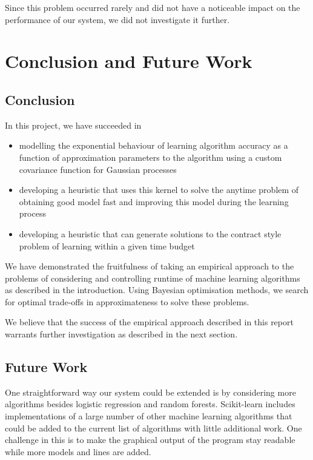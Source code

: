 \documentclass[a4paper,12pt,twoside,openright]{report}
\begin{document}
Since this problem occurred rarely and did not have a noticeable impact on the performance of our system, we did not investigate it further.







\chapter{Conclusion and Future Work} 
\section{Conclusion}
In this project, we have succeeded in
\begin{itemize}
	\item modelling the exponential behaviour of learning algorithm accuracy as a function of approximation parameters to the algorithm using a custom covariance function for Gaussian processes
	\item developing a heuristic that uses this kernel to solve the anytime problem of obtaining good model fast and improving this model during the learning process
	\item developing a heuristic that can generate solutions to the contract style problem of learning within a given time budget
\end{itemize}

We have demonstrated the fruitfulness of taking an empirical approach to the problems of considering and controlling runtime of machine learning algorithms as described in the introduction. Using Bayesian optimisation methods, we search for optimal trade-offs in approximateness to solve these problems.

We believe that the success of the empirical approach described in this report warrants further investigation as described in the next section.

\section{Future Work}
One straightforward way our system could be extended is by considering more algorithms besides logistic regression and random forests. Scikit-learn includes implementations of a large number of other machine learning algorithms that could be added to the current list of algorithms with little additional work. One challenge in this is to make the graphical output of the program stay readable while more models and lines are added.
\end{document}
